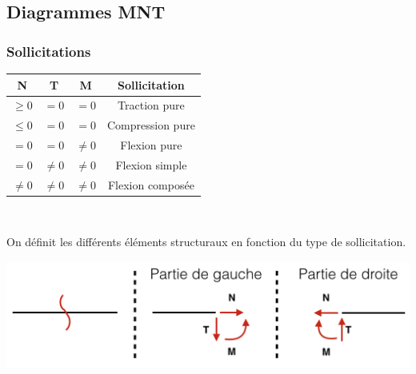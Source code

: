 	\subsection*{Diagrammes MNT}
		\subsubsection{Sollicitations}
		\begin{center}
		\begin{tabular}{|c|c|c|c|}
		\hline 
		N & T & M & Sollicitation \\ 
		\hline 
		$\geq 0$ & $=0$ & $= 0$ & Traction pure \\ 
		$\leq 0 $ & $=0$ & $=0$ & Compression pure \\ 
		$=0$ & $=0$ & $\neq 0$ & Flexion pure \\ 
		$=0$ & $\neq 0$ & $\neq 0$ & Flexion simple \\ 
		$\neq 0$ & $\neq 0$ & $\neq 0$ & Flexion composée \\ 
		\hline 
		\end{tabular} 
		\ \\
		\end{center}
		On définit les différents éléments structuraux en fonction du type de sollicitation. 
		\begin{center}
			\includegraphics[scale=0.5]{Annexes/Rappels/1}
		\end{center}